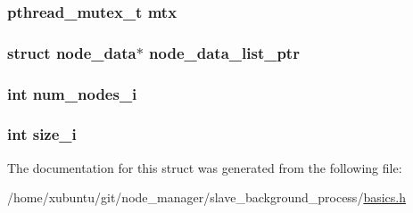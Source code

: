 \subsubsection[{mtx}]{\setlength{\rightskip}{0pt plus 5cm}pthread\+\_\+mutex\+\_\+t mtx}\label{structcluster__info_a2680f9fe5653a596c7e779b838180fdc}
\hypertarget{structcluster__info_a91dfea1717d57e65d6f0bbcd3916d5cf}{}
\subsubsection[{node\+\_\+data\+\_\+list\+\_\+ptr}]{\setlength{\rightskip}{0pt plus 5cm}struct {\bf node\+\_\+data}$\ast$ node\+\_\+data\+\_\+list\+\_\+ptr}\label{structcluster__info_a91dfea1717d57e65d6f0bbcd3916d5cf}
\hypertarget{structcluster__info_a9ec723e70de19c5ea3598c01b58f0733}{}
\subsubsection[{num\+\_\+nodes\+\_\+i}]{\setlength{\rightskip}{0pt plus 5cm}int num\+\_\+nodes\+\_\+i}\label{structcluster__info_a9ec723e70de19c5ea3598c01b58f0733}
\hypertarget{structcluster__info_ab55c14162544e8f537b897619704e7e8}{}
\subsubsection[{size\+\_\+i}]{\setlength{\rightskip}{0pt plus 5cm}int size\+\_\+i}\label{structcluster__info_ab55c14162544e8f537b897619704e7e8}


The documentation for this struct was generated from the following file\+:\begin{DoxyCompactItemize}
\item 
/home/xubuntu/git/node\+\_\+manager/slave\+\_\+background\+\_\+process/\hyperlink{basics_8h}{basics.\+h}\end{DoxyCompactItemize}
